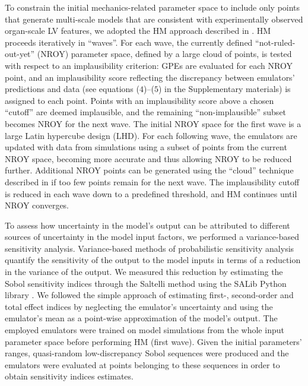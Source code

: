 \vspace{0.2cm}
To constrain the initial mechanics-related parameter space to include only points that generate multi-scale models that are consistent with experimentally observed organ-scale LV features, we adopted the HM approach described in \cite{Coveney:2018}. HM proceeds iteratively in \enquote{waves}. For each wave, the currently defined \enquote{not-ruled-out-yet} (NROY) parameter space, defined by a large cloud of points, is tested with respect to an implausibility criterion: GPEs are evaluated for each NROY point, and an implausibility score reflecting the discrepancy between emulators' predictions and data (see equations ($4$)--($5$) in the Supplementary materials) is assigned to each point. Points with an implausibility score above a chosen \enquote{cutoff} are deemed implausible, and the remaining \enquote{non-implausible} subset becomes NROY for the next wave. The initial NROY space for the first wave is a large Latin hypercube design (LHD). For each following wave, the emulators are updated with data from simulations using a subset of points from the current NROY space, becoming more accurate and thus allowing NROY to be reduced further. Additional NROY points can be generated using the \enquote{cloud} technique described in \cite{Coveney:2018} if too few points remain for the next wave. The implausibility cutoff is reduced in each wave down to a predefined threshold, and HM continues until NROY converges.


\vspace{0.2cm}
To assess how uncertainty in the model's output can be attributed to different sources of uncertainty in the model input factors, we performed a variance-based sensitivity analysis. Variance-based methods of probabilistic sensitivity analysis quantify the sensitivity of the output to the model inputs in terms of a reduction in the variance of the output. We measured this reduction by estimating the Sobol sensitivity indices \cite{Sobol:2001} through the Saltelli method \cite{Saltelli:2010} using the SALib Python library \cite{Herman:2017}. We followed the simple approach of estimating first-, second-order and total effect indices by neglecting the emulator's uncertainty and using the emulator's mean as a point-wise approximation of the model's output. The employed emulators were trained on model simulations from the whole input parameter space before performing HM (first wave). Given the initial parameters' ranges, quasi-random low-discrepancy Sobol sequences were produced and the emulators were evaluated at points belonging to these sequences in order to obtain sensitivity indices estimates.

